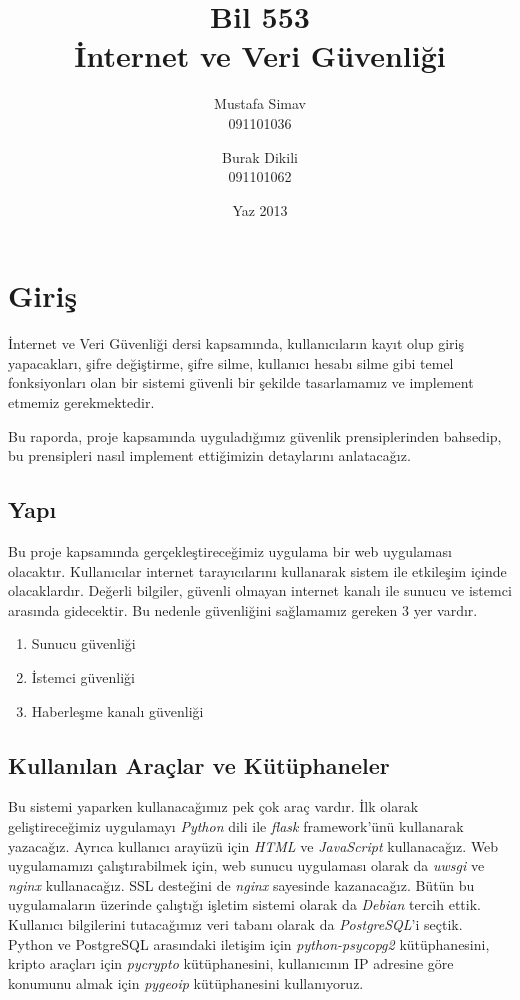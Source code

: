 \documentclass[11pt]{report}
\title{\textbf{Bil 553} \\ İnternet ve Veri Güvenliği}
\author{Mustafa Simav \\
       091101036
    \and
        Burak Dikili \\
        091101062}
\date{Yaz 2013}
\begin{document}
\maketitle

\chapter{Giriş}

İnternet ve Veri Güvenliği dersi kapsamında, kullanıcıların kayıt olup giriş yapacakları, şifre değiştirme, şifre silme, kullanıcı hesabı silme gibi temel fonksiyonları olan bir sistemi güvenli bir şekilde tasarlamamız ve implement etmemiz gerekmektedir.

Bu raporda, proje kapsamında uyguladığımız güvenlik prensiplerinden bahsedip, bu prensipleri nasıl implement ettiğimizin detaylarını anlatacağız.

\section{Yapı}

Bu proje kapsamında gerçekleştireceğimiz uygulama bir web uygulaması olacaktır. Kullanıcılar internet tarayıcılarını kullanarak sistem ile etkileşim içinde olacaklardır. Değerli bilgiler, güvenli olmayan internet kanalı ile sunucu ve istemci arasında gidecektir. Bu nedenle güvenliğini sağlamamız gereken 3 yer vardır.

\begin{enumerate}
\item Sunucu güvenliği
\item İstemci güvenliği
\item Haberleşme kanalı güvenliği
\end{enumerate}

\section{Kullanılan Araçlar ve Kütüphaneler}

Bu sistemi yaparken kullanacağımız pek çok araç vardır. İlk olarak geliştireceğimiz uygulamayı \emph{Python} dili ile \emph{flask} framework'ünü kullanarak yazacağız. Ayrıca kullanıcı arayüzü için \emph{HTML} ve \emph{JavaScript} kullanacağız. Web uygulamamızı çalıştırabilmek için, web sunucu uygulaması olarak da \emph{uwsgi} ve \emph{nginx} kullanacağız. SSL desteğini de \emph{nginx} sayesinde kazanacağız. Bütün bu uygulamaların üzerinde çalıştığı işletim sistemi olarak da \emph{Debian} tercih ettik. Kullanıcı bilgilerini tutacağımız veri tabanı olarak da \emph{PostgreSQL}'i seçtik. Python ve PostgreSQL arasındaki iletişim için \emph{python-psycopg2} kütüphanesini, kripto araçları için \emph{pycrypto} kütüphanesini, kullanıcının IP adresine göre konumunu almak için \emph{pygeoip} kütüphanesini kullanıyoruz.
\end{document}
